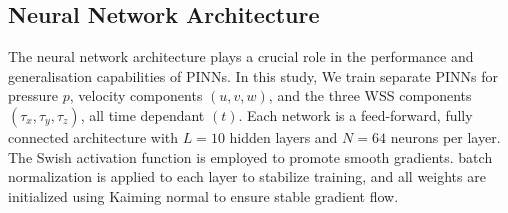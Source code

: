 \documentclass[12pt, a4paper]{article}
\begin{document}




\subsection{Neural Network Architecture}
\label{sec:PINN_Architecture_Training}

The neural network architecture plays a crucial role in the performance and generalisation capabilities of PINNs. In this study, We train separate PINNs for pressure $p$, velocity components $(u, v, w)$, and the three WSS components $(\tau_x, \tau_y, \tau_z)$, all time dependant $(t)$. Each network is a feed-forward, fully connected architecture with $L=10$ hidden layers and $N=64$ neurons per layer. The Swish activation function \citep{ramachandran2017searching} is employed to promote smooth gradients. batch normalization is applied to each layer to stabilize training, and all weights are initialized using Kaiming normal \citep{he2015delving} to ensure stable gradient flow.
\end{document}
